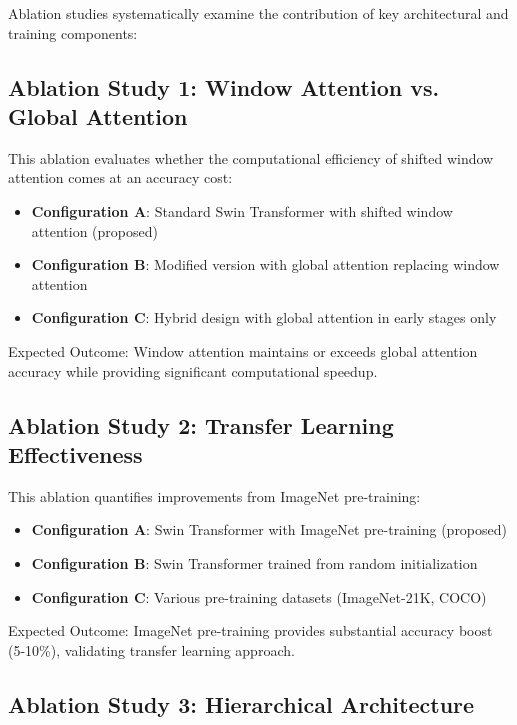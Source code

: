 Ablation studies systematically examine the contribution of key architectural and training components:

\subsection{Ablation Study 1: Window Attention vs. Global Attention}

This ablation evaluates whether the computational efficiency of shifted window attention comes at an accuracy cost:

\begin{itemize}
    \item \textbf{Configuration A}: Standard Swin Transformer with shifted window attention (proposed)
    \item \textbf{Configuration B}: Modified version with global attention replacing window attention
    \item \textbf{Configuration C}: Hybrid design with global attention in early stages only
\end{itemize}

Expected Outcome: Window attention maintains or exceeds global attention accuracy while providing significant computational speedup.

\subsection{Ablation Study 2: Transfer Learning Effectiveness}

This ablation quantifies improvements from ImageNet pre-training:

\begin{itemize}
    \item \textbf{Configuration A}: Swin Transformer with ImageNet pre-training (proposed)
    \item \textbf{Configuration B}: Swin Transformer trained from random initialization
    \item \textbf{Configuration C}: Various pre-training datasets (ImageNet-21K, COCO)
\end{itemize}

Expected Outcome: ImageNet pre-training provides substantial accuracy boost (5-10\%), validating transfer learning approach.

\subsection{Ablation Study 3: Hierarchical Architecture}

